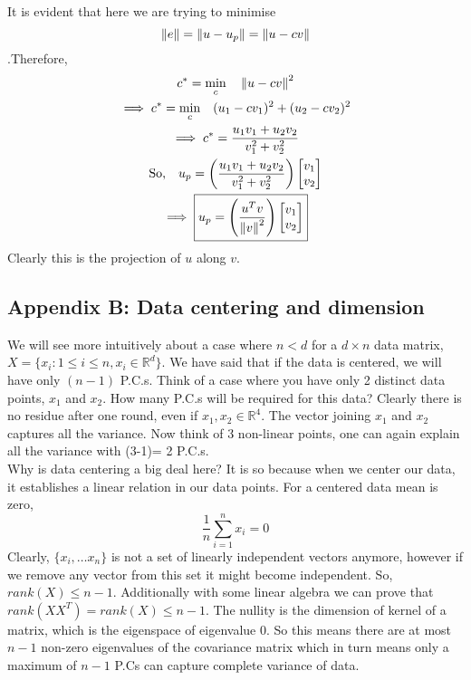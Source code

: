 \documentclass[12pt,a4paper]{article}
\begin{document}
\noindent It is evident that here we are trying to minimise $$\norm{e} = \norm{u -u_p} = \norm{u - cv}$$.Therefore,
\begin{gather*}
    c^{*}=\min_{c} \quad \norm{u-cv}^2 \\
    \implies c^{*}=\min_{c} \quad (u_1 - cv_1)^2+(u_2-cv_2)^2\\
    \implies c^{*} = \dfrac{u_1v_1+u_2v_2}{v_{1}^{2}+v_{2}^{2}}\\
    \text{So,} \quad u_p = \left( \dfrac{u_1v_1+u_2v_2}{v_{1}^{2}+v_{2}^{2}} \right) \begin{bmatrix}v_1 \\ v_2 \end{bmatrix}\\
    \implies \boxed{u_p = \left( \dfrac{u^Tv}{\norm{v}^2}\right) \begin{bmatrix}v_1 \\ v_2 \end{bmatrix}}
\end{gather*}
Clearly this is the projection of $u$ along $v$.


\newpage
\subsection{Appendix B: Data centering and dimension}
We will see more intuitively about a case where $n<d$ for a $d \times n$ data matrix, $X = \{x_i:1\leq i\leq n,x_i\in\mathbb{R}^d\}$. We have said that if the data is centered, we will have only $(n-1)$ P.C.s. Think of a case where you have only 2 distinct data points, $x_1$ and $x_2$. How many P.C.s will be required for this data? Clearly there is no residue after one round, even if $x_1,x_2 \in \mathbb{R}^4$. The vector joining $x_1$ and $x_2$ captures all the variance.
Now think of 3 non-linear points, one can again explain all the variance with (3-1)= 2 P.C.s. \\
Why is data centering a big deal here? It is so because when we center our data, it establishes a linear relation in our data points. For a centered data mean is zero, $$ \dfrac{1}{n}\sum_{i=1}^{n} x_i = 0$$
Clearly, $\{x_i, \dots x_n\}$ is not a set of linearly independent vectors anymore, however if we remove any vector from this set it might become independent. So, $rank(X) \leq n-1$.
Additionally with some linear algebra we can prove that $rank(XX^T) = rank(X) \leq n-1$. The nullity is the dimension of kernel of a matrix, which is the eigenspace of eigenvalue 0. So this means there are at most $n-1$ non-zero eigenvalues of the covariance matrix which in turn means only a maximum of $n-1$ P.Cs can capture complete variance of data.
\end{document}
